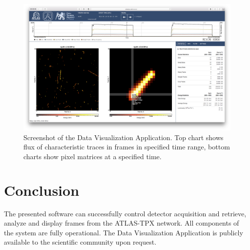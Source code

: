 \documentclass[journal]{IEEEtran}
\begin{document}
\begin{figure}[tbp]
	\centering
        \includegraphics[clip, width=.45\textwidth, angle = 0 ]{Plots/screen-tpx01-crosshair-zoomed.png}
	  \caption {Screenshot of the Data Visualization Application. \cite{Manek2016} Top chart shows flux of characteristic traces in frames in specified time range, bottom charts show pixel matrices at a specified time.}
    \label{fig:positions}
\end{figure}

\section{\label{sec:conclusion}Conclusion}
The presented software can successfully control detector acquisition and retrieve, analyze and display frames from the ATLAS-TPX network. All components of the system are fully operational. The Data Visualization Application is publicly available to the scientific community upon request.


%

%
\end{document}
